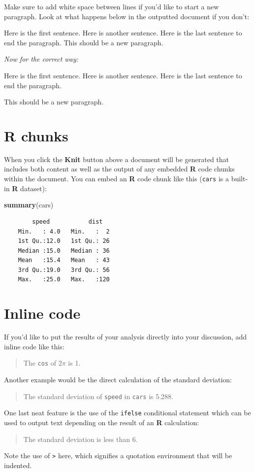 \documentclass[12pt, twoside]{amherstthesis}
\newenvironment{Shaded}{\begin{snugshade}}{\end{snugshade}}
\newcommand{\KeywordTok}[1]{\textcolor[rgb]{0.13,0.29,0.53}{\textbf{#1}}}
\newcommand{\NormalTok}[1]{#1}
\theoremstyle{definition}
\theoremstyle{definition}
\theoremstyle{definition}
\theoremstyle{remark}
\begin{document}
Make sure to add white space between lines if you'd like to start a new paragraph. Look at what happens below in the outputted document if you don't:

Here is the first sentence. Here is another sentence. Here is the last sentence to end the paragraph.
This should be a new paragraph.

\emph{Now for the correct way:}

Here is the first sentence. Here is another sentence. Here is the last sentence to end the paragraph.

This should be a new paragraph.

\hypertarget{r-chunks}{%
\section{R chunks}\label{r-chunks}}

When you click the \textbf{Knit} button above a document will be generated that includes both content as well as the output of any embedded \textbf{R} code chunks within the document. You can embed an \textbf{R} code chunk like this (\texttt{cars} is a built-in \textbf{R} dataset):
\begin{Shaded}
\begin{Highlighting}[]
\KeywordTok{summary}\NormalTok{(cars)}
\end{Highlighting}
\end{Shaded}
\begin{verbatim}
        speed           dist    
    Min.   : 4.0   Min.   :  2  
    1st Qu.:12.0   1st Qu.: 26  
    Median :15.0   Median : 36  
    Mean   :15.4   Mean   : 43  
    3rd Qu.:19.0   3rd Qu.: 56  
    Max.   :25.0   Max.   :120
\end{verbatim}
\hypertarget{inline-code}{%
\section{Inline code}\label{inline-code}}

If you'd like to put the results of your analysis directly into your discussion, add inline code like this:
\begin{quote}
The \texttt{cos} of \(2 \pi\) is 1.
\end{quote}
Another example would be the direct calculation of the standard deviation:
\begin{quote}
The standard deviation of \texttt{speed} in \texttt{cars} is 5.288.
\end{quote}
One last neat feature is the use of the \texttt{ifelse} conditional statement which can be used to output text depending on the result of an \textbf{R} calculation:
\begin{quote}
The standard deviation is less than 6.
\end{quote}
Note the use of \texttt{\textgreater{}} here, which signifies a quotation environment that will be indented.
\end{document}
